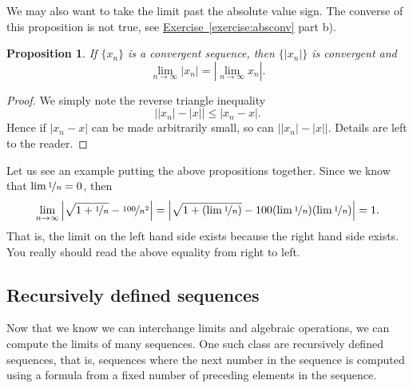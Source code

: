\documentclass[12pt]{book}
\newcommand{\abs}[1]{\left\lvert {#1} \right\rvert}
\theoremstyle{plain}
\newtheorem{prop}[thm]{Proposition}
\theoremstyle{remark}
\theoremstyle{definition}
\theoremstyle{exercise}
\theoremstyle{example}
\newcommand{\exerciseref}[1]{\hyperref[#1]{Exercise~\ref*{#1}}}
\begin{document}
We may also want to take the limit past the absolute value sign.
The converse of this proposition is not true, see
\exerciseref{exercise:absconv} part b).

\begin{prop}
If $\{ x_n \}$ is a convergent sequence, then $\{ \abs{x_n} \}$
is convergent and
\begin{equation*}
\lim_{n\to\infty} \abs{x_n} = 
\abs{\lim_{n\to\infty} x_n} .
\end{equation*}
\end{prop}

\begin{proof}
We simply note the reverse triangle inequality
\begin{equation*}
\big\lvert \abs{x_n} - \abs{x} \big\rvert \leq \abs{x_n-x} .
\end{equation*}
Hence if $\abs{x_n -x}$ can be made arbitrarily small, so can
$\big\lvert \abs{x_n} - \abs{x} \big\rvert$.
Details are left to the reader.
\end{proof}

Let us see an example putting the above propositions together.  Since
we know that $\lim \nicefrac{1}{n} = 0$, then
\begin{equation*}
\lim_{n\to \infty}
\abs{\sqrt{1 + \nicefrac{1}{n}} - \nicefrac{100}{n^2}} =  
\abs{\sqrt{1 + (\lim \nicefrac{1}{n})} - 100 (\lim \nicefrac{1}{n})(\lim
\nicefrac{1}{n})} = 1.
\end{equation*}
That is, the limit on the left hand side exists because the right hand
side exists.  You really should read the above equality from right to left.

\subsection{Recursively defined sequences}

Now that we know we can interchange limits and algebraic operations, we can
compute the limits of many sequences.
One such class are recursively defined sequences, that is, sequences where
the next number in the sequence is computed using a formula from a fixed number
of preceding elements in the sequence.
\end{document}
